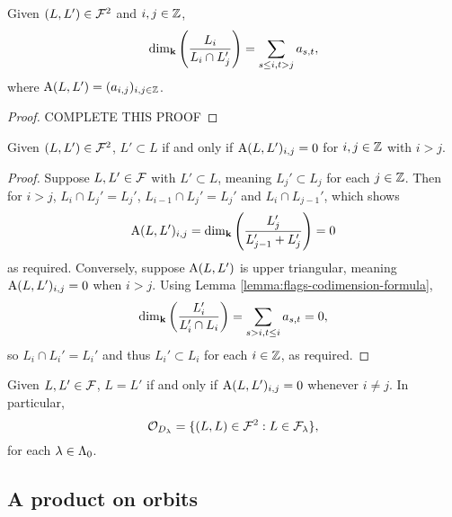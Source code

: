 \documentclass[a4paper, 11pt]{report}
\begin{document}
\begin{lemma}\label{lemma:flags-codimension-formula}
Given $(L,L')\in\mathcal{F}^2$ and $i,j\in\mathbb{Z}$,
\begin{equation*}
\dim_{\mathbf{k}}\left(\frac{L_i}{L_i\cap L_j'}\right) = \sum_{s\le i, t>j} a_{s,t},
\end{equation*}
where $\operatorname{A}(L,L')=(a_{i,j})_{i,j\in\mathbb{Z}}$.
\end{lemma}
\begin{proof}
{\color{red}COMPLETE THIS PROOF}	
\end{proof}

\begin{lemma}
Given $(L,L')\in\mathcal{F}^2$, $L'\subset L$ if and only if $\operatorname{A}(L,L')_{i,j}=0$ for $i,j\in\mathbb{Z}$ with $i>j$.
\end{lemma}
\begin{proof}
Suppose $L,L'\in\mathcal{F}$ with $L'\subset L$, meaning $L_j'\subset L_j$ for each $j\in\mathbb{Z}$. Then for $i>j$, $L_i\cap L_j' = L_j'$, $L_{i-1}\cap L_j' = L_j'$ and $L_i\cap L_{j-1}'$, which shows
\begin{equation*}
\operatorname{A}(L,L')_{i,j} = \dim_{\mathbf{k}}\left(\frac{L_j'}{L_{j-1}'+L_j'}\right) = 0
\end{equation*}
as required. Conversely, suppose $\operatorname{A}(L,L')$ is upper triangular, meaning $\operatorname{A}(L,L')_{i,j}=0$ when $i>j$. Using Lemma \ref{lemma:flags-codimension-formula},
\begin{equation*}
\dim_{\mathbf{k}}\left(\frac{L_i'}{L_i'\cap L_i}\right) = \sum_{s>i,t\le i} a_{s,t} = 0,
\end{equation*}
so $L_i\cap L_i' = L_i'$ and thus $L_i'\subset L_i$ for each $i\in\mathbb{Z}$, as required.
\end{proof}

\begin{corollary}\label{corollary:diagonal-orbits}
Given $L,L'\in\mathcal{F}$, $L=L'$ if and only if $\operatorname{A}(L,L')_{i,j}=0$ whenever $i\neq j$. In particular,
\begin{equation*}
\mathcal{O}_{D_\lambda} = \{(L,L)\in\mathcal{F}^2: L\in\mathcal{F}_\lambda\},
\end{equation*}
for each $\lambda\in{\Lambda_0}$.
\end{corollary}

\subsection{A product on orbits}\label{sec:orbit-product}
\end{document}
